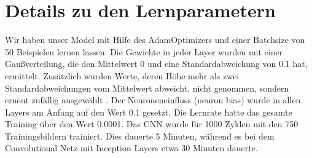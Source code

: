 \documentclass[runningheads,a4paper]{llncs}[2015/06/24]
\begin{document}
\section{Details zu den Lernparametern}
Wir haben unser Model mit Hilfe des AdamOptimizers und einer Batchsize von 50 Beispielen lernen lassen. Die Gewichte in jeder Layer wurden mit einer Gaußverteilung, die den Mittelwert 0 und eine Standardabweichung von 0.1 hat, ermittelt. Zusätzlich wurden Werte, deren Höhe mehr als zwei Standardabweichungen vom Mittelwert abweicht, nicht genommen, sondern erneut zufällig ausgewählt \cite{tensorflow}. Der Neuroneneinfluss (neuron bias) wurde in allen Layers am Anfang auf den Wert 0.1 gesetzt. Die Lernrate hatte das gesamte Training über den Wert 0.0001. Das CNN wurde für 1000 Zyklen mit den 750 Trainingsbildern trainiert. Dies dauerte 5 Minuten, während es bei dem Convolutional Netz mit Inception Layers etwa 30 Minuten dauerte. 
\end{document}
